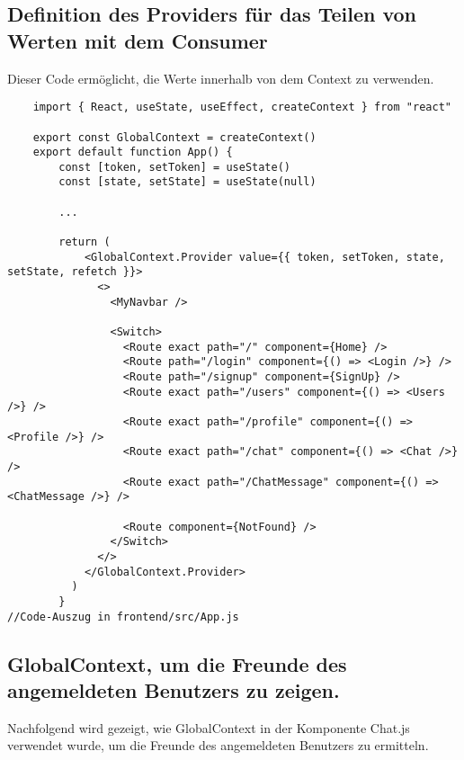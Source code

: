 \subsection{Definition des Providers für das Teilen von Werten mit dem Consumer }\label{subsec_UabsAnhang}
Dieser Code ermöglicht, die Werte innerhalb von dem Context zu verwenden.
\begin{lstlisting}
    import { React, useState, useEffect, createContext } from "react"

    export const GlobalContext = createContext()
    export default function App() {
        const [token, setToken] = useState()
        const [state, setState] = useState(null)
        
        ...
   
        return (
            <GlobalContext.Provider value={{ token, setToken, state, setState, refetch }}>
              <>
                <MyNavbar />
        
                <Switch>
                  <Route exact path="/" component={Home} />
                  <Route path="/login" component={() => <Login />} />
                  <Route path="/signup" component={SignUp} />
                  <Route exact path="/users" component={() => <Users />} />
                  <Route exact path="/profile" component={() => <Profile />} />
                  <Route exact path="/chat" component={() => <Chat />} />
                  <Route exact path="/ChatMessage" component={() => <ChatMessage />} />
        
                  <Route component={NotFound} />
                </Switch>
              </>
            </GlobalContext.Provider>
          )
        }
//Code-Auszug in frontend/src/App.js
 \end{lstlisting}

\subsection{GlobalContext, um die Freunde des angemeldeten Benutzers zu zeigen. }\label{subsec_UabsAnhang}
Nachfolgend wird gezeigt, wie GlobalContext in der Komponente Chat.js verwendet wurde, um die Freunde des angemeldeten Benutzers zu ermitteln.

